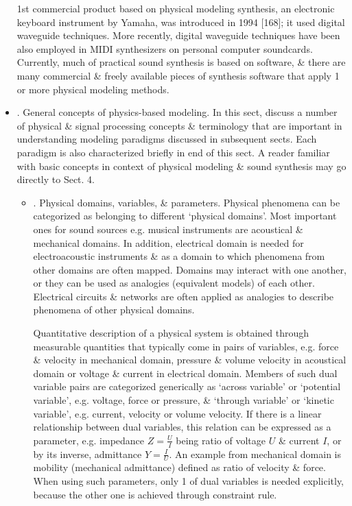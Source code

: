 \documentclass{article}
\begin{document}
\begin{itemize}
	1st commercial product based on physical modeling synthesis, an electronic keyboard instrument by Yamaha, was introduced in 1994 [168]; it used digital waveguide techniques. More recently, digital waveguide techniques have been also employed in MIDI synthesizers on personal computer soundcards. Currently, much of practical sound synthesis is based on software, \& there are many commercial \& freely available pieces of synthesis software that apply 1 or more physical modeling methods.
	\item {. General concepts of physics-based modeling.} In this sect, discuss a number of physical \& signal processing concepts \& terminology that are important in understanding modeling paradigms discussed in subsequent sects. Each paradigm is also characterized briefly in end of this sect. A  reader familiar with basic concepts in context of physical modeling \& sound synthesis may go directly to Sect. 4.
	\begin{itemize}
		\item {. Physical domains, variables, \& parameters.} Physical phenomena can be categorized as belonging to different `physical domains'. Most important ones for sound sources e.g. musical instruments are acoustical \& mechanical domains. In addition, electrical domain is needed for electroacoustic instruments \& as a domain to which phenomena from other domains are often mapped. Domains may interact with one another, or they can be used as analogies (equivalent models) of each other. Electrical circuits \& networks are often applied as analogies to describe phenomena of other physical domains.
		
		Quantitative description of a physical system is obtained through measurable quantities that typically come in pairs of variables, e.g. force \& velocity in mechanical domain, pressure \& volume velocity in acoustical domain or voltage \& current in electrical domain. Members of such dual variable pairs are categorized generically as `across variable' or `potential variable', e.g. voltage, force or pressure, \& `through variable' or `kinetic variable', e.g. current, velocity or volume velocity. If there is a linear relationship between dual variables, this relation can be expressed as a parameter, e.g. impedance $Z = \frac{U}{I}$ being ratio of voltage $U$ \& current $I$, or by its inverse, admittance $Y = \frac{I}{U}$. An example from mechanical domain is mobility (mechanical admittance) defined as ratio of velocity \& force. When using such parameters, only 1 of dual variables is needed explicitly, because the other one is achieved through constraint rule.
		

\end{itemize}
\end{itemize}
\end{document}
